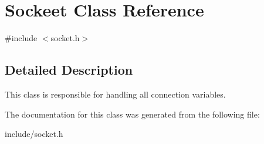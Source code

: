 \hypertarget{classSockeet}{}\section{Sockeet Class Reference}
\label{classSockeet}


{\ttfamily \#include $<$socket.\+h$>$}



\subsection{Detailed Description}
This class is responsible for handling all connection variables. 

The documentation for this class was generated from the following file\+:\begin{DoxyCompactItemize}
\item 
include/socket.\+h\end{DoxyCompactItemize}
